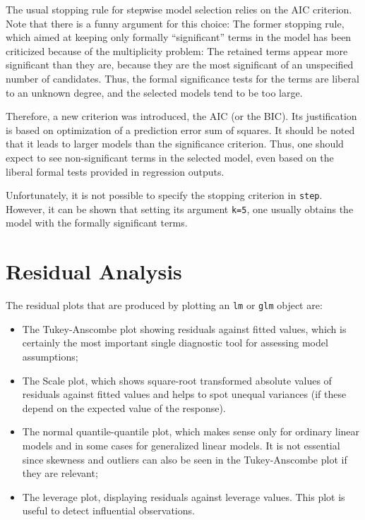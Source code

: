\documentclass[11pt]{article}
\providecommand{\T}{\texttt}
\providecommand{\Vneed}[1]{\penalty-5000\vskip#1%
\penalty-5000\vspace{-#1}}
\begin{document}
The usual stopping rule for stepwise model selection relies on the AIC
criterion. Note that there is a funny argument for this choice:
The former stopping rule, which aimed at keeping only formally
``significant'' terms in the model has been criticized because of the
multiplicity problem: The retained terms appear more significant than they
are, because they are the most significant of an unspecified number of
candidates. Thus, the formal significance tests for the terms are liberal
to an unknown degree, and the selected models tend to be too large.

Therefore, a new criterion was introduced, the AIC (or the BIC).
Its justification is based on optimization of a prediction error sum of 
squares. It should be noted that it leads to larger models than the
significance criterion. Thus, one should expect to see non-significant
terms in the selected model, even based on the liberal formal tests
provided in regression outputs.

Unfortunately, it is not possible to specify the stopping criterion 
in \T{step}. However, it can be shown that setting its argument \T{k=5},
one usually obtains the model with the formally significant terms.


\Vneed{50mm}
\section{Residual Analysis}
The residual plots that are produced by plotting an \T{lm} or \T{glm}
object are: 
\begin{itemize}
\item 
The Tukey-Anscombe plot showing residuals against fitted values,
which is certainly the most important single diagnostic tool for assessing
model assumptions;
\item
The Scale plot, which shows square-root transformed absolute values of
residuals against 
fitted values and helps to spot unequal variances (if these depend on the
expected value of the response).
\item
The normal quantile-quantile plot, which makes sense only for ordinary
linear models and in some cases for generalized linear models. 
It is not essential since skewness and outliers can also be seen in the
Tukey-Anscombe plot if they are relevant;
\item
The leverage plot, displaying residuals against leverage values.
This plot is useful to detect influential observations.
\end{itemize}
\end{document}
